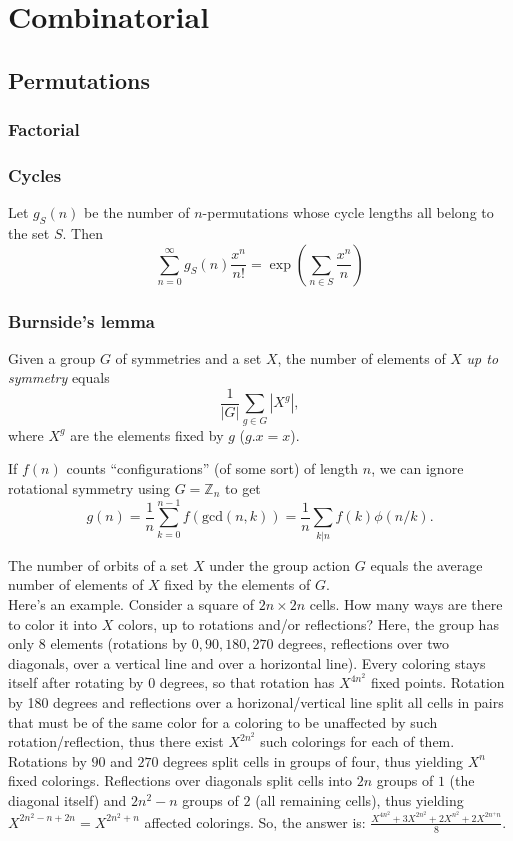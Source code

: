 \chapter{Combinatorial}

\section{Permutations}
	\subsection{Factorial}
		

	\subsection{Cycles}
		Let $g_S(n)$ be the number of $n$-permutations whose cycle lengths all belong to the set $S$. Then
		$$\sum_{n=0} ^\infty g_S(n) \frac{x^n}{n!} = \exp\left(\sum_{n\in S} \frac{x^n} {n} \right)$$

	\subsection{Burnside's lemma}
		Given a group $G$ of symmetries and a set $X$, the number of elements of $X$ \emph{up to symmetry} equals
		 \[ {\frac {1}{|G|}}\sum _{{g\in G}}|X^{g}|, \]
		 where $X^{g}$ are the elements fixed by $g$ ($g.x = x$).

		 If $f(n)$ counts ``configurations'' (of some sort) of length $n$, we can ignore rotational symmetry using $G = \mathbb Z_n$ to get
		 \[ g(n) = \frac 1 n \sum_{k=0}^{n-1}{f(\text{gcd}(n, k))} = \frac 1 n \sum_{k|n}{f(k)\phi(n/k)}. \]

     The number of orbits of a set $X$ under the group action $G$ equals the average number of elements of $X$ fixed by the elements of $G$.\\
     Here’s an example. Consider a square of $2n \times 2n$ cells. How many ways are there to color it into $X$ colors, up to rotations and/or reflections?
     Here, the group has only $8$ elements (rotations by $0, 90, 180, 270$ degrees, reflections over two diagonals, over a vertical line and over a horizontal line).
     Every coloring stays itself after rotating by $0$ degrees, so that rotation has $X^{4n^2}$ fixed points.
     Rotation by 180 degrees and reflections over a horizonal/vertical line split all cells in pairs that must be of the same color
     for a coloring to be unaffected by such rotation/reflection, thus there exist $X^{2n^2}$ such colorings for each of them.
     Rotations by $90$ and $270$ degrees split cells in groups of four, thus yielding $X^n$ fixed colorings.
     Reflections over diagonals split cells into $2n$ groups of $1$ (the diagonal itself) and $2n^2-n$  groups of $2$ (all remaining cells),
     thus yielding $X^{2n^2-n+2n} = X^{2n^2+n}$ affected colorings. So, the answer is: $\frac{X^{4n^2} + 3X^{2n^2} + 2X^{n^2} + 2X^{2n^+n}}{8}$.

